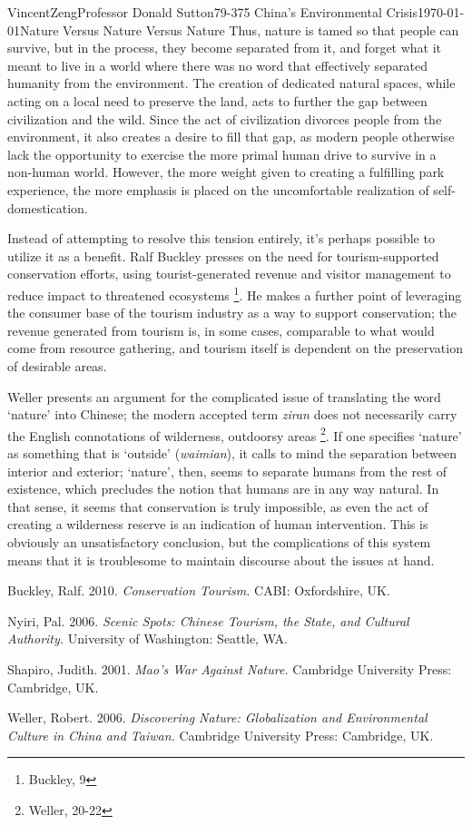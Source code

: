 \documentclass[12pt]{article}
\begin{document}
\begin{mla}{Vincent}{Zeng}{Professor Donald Sutton}{79-375 China's Environmental Crisis}{\today}{Nature Versus Nature Versus Nature}
Thus, nature is tamed so that people can survive, but in the process, they
become separated from it, and forget what it meant to live in a world where
there was no word that effectively separated humanity from the environment.
The creation of dedicated natural spaces, while acting on a local need to
preserve the land, acts to further the gap between civilization and the wild.
Since the act of civilization divorces people from the environment, it also
creates a desire to fill that gap, as modern people 
otherwise lack the opportunity to exercise the more primal human
drive to survive in a non-human world. However, the more weight given to
creating a fulfilling park experience, the more emphasis is placed on the
uncomfortable realization of self-domestication.

Instead of attempting to resolve this tension entirely, it's perhaps possible
to utilize it as a benefit. Ralf Buckley presses on the need for
tourism-supported conservation efforts, using tourist-generated revenue and
visitor management to reduce impact to threatened ecosystems \footnote{Buckley,
9}. He makes a further point of leveraging the consumer base of the tourism
industry as a way to support conservation; the revenue generated from tourism
is, in some cases, comparable to what would come from resource gathering, and tourism itself is
dependent on the preservation of desirable areas.

Weller presents an argument for the complicated issue of translating the word
`nature' into Chinese; the modern accepted term \textit{ziran} does not
necessarily carry the English connotations of wilderness, outdoorsy areas
\footnote{Weller, 20-22}. If one specifies `nature' as something that is
`outside' (\textit{waimian}), it calls to mind the separation between interior and exterior;
`nature', then, seems to separate humans from the rest of existence, which
precludes the notion that humans are in any way natural. In that sense,
it seems that conservation is truly impossible, as even the act of creating a
wilderness reserve is an indication of human intervention. This is obviously an
unsatisfactory conclusion, but the complications of this system means that it
is troublesome to maintain discourse about the issues at hand.

\begin{workscited}
	\bibent 
	Buckley, Ralf. 2010. \textit{Conservation Tourism.} CABI: Oxfordshire, UK.

	\bibent
	Nyiri, Pal. 2006. \textit{Scenic Spots: Chinese Tourism, the State, and Cultural Authority.} University of Washington: Seattle, WA.

	\bibent
	Shapiro, Judith. 2001. \textit{Mao's War Against Nature.} Cambridge University Press: Cambridge, UK.

	\bibent
	Weller, Robert. 2006. \textit{Discovering Nature: Globalization and Environmental Culture in China and Taiwan.} Cambridge University Press: Cambridge, UK.
\end{workscited}
\end{mla}
\end{document}
